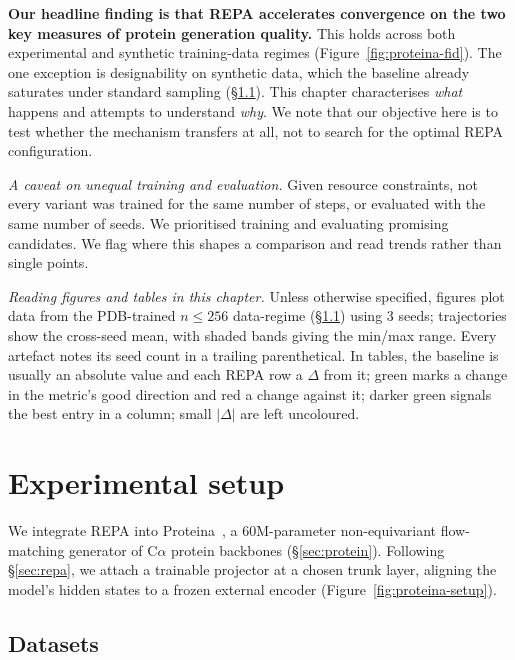 \documentclass[12pt,a4paper,twoside]{report}
\begin{document}
\textbf{Our headline finding is that REPA accelerates convergence on the two key measures of protein generation quality.} This holds across both experimental and synthetic training-data regimes (Figure~\ref{fig:proteina-fid}). The one exception is designability on synthetic data, which the baseline already saturates under standard sampling (\S\ref{sec:proteina-datasets}). This chapter characterises \emph{what} happens and attempts to understand \emph{why}. We note that our objective here is to test whether the mechanism transfers at all, not to search for the optimal REPA configuration.

\emph{A caveat on unequal training and evaluation.} Given resource constraints, not every variant was trained for the same number of steps, or evaluated with the same number of seeds. We prioritised training and evaluating promising candidates. We flag where this shapes a comparison and read trends rather than single points.

\emph{Reading figures and tables in this chapter.} Unless otherwise specified, figures plot data from the PDB-trained $n\le 256$ data-regime (\S\ref{sec:proteina-datasets}) using 3 seeds; trajectories show the cross-seed mean, with shaded bands giving the min/max range. Every artefact notes its seed count in a trailing parenthetical. In tables, the baseline is usually an absolute value and each REPA row a $\Delta$ from it; \colorbox{green!20}{green} marks a change in the metric's good direction and \colorbox{red!15}{red} a change against it; \colorbox{green!42}{darker green} signals the best entry in a column; small $|\Delta|$ are left uncoloured.



\section{Experimental setup}
\label{sec:proteina-setup}

We integrate REPA into Proteina~\cite{Proteina}, a 60M-parameter non-equivariant flow-matching generator of C$\alpha$ protein backbones (\S\ref{sec:protein}). Following \S\ref{sec:repa}, we attach a trainable projector at a chosen trunk layer, aligning the model's hidden states to a frozen external encoder (Figure~\ref{fig:proteina-setup}).

\subsection{Datasets}
\label{sec:proteina-datasets}
\end{document}
